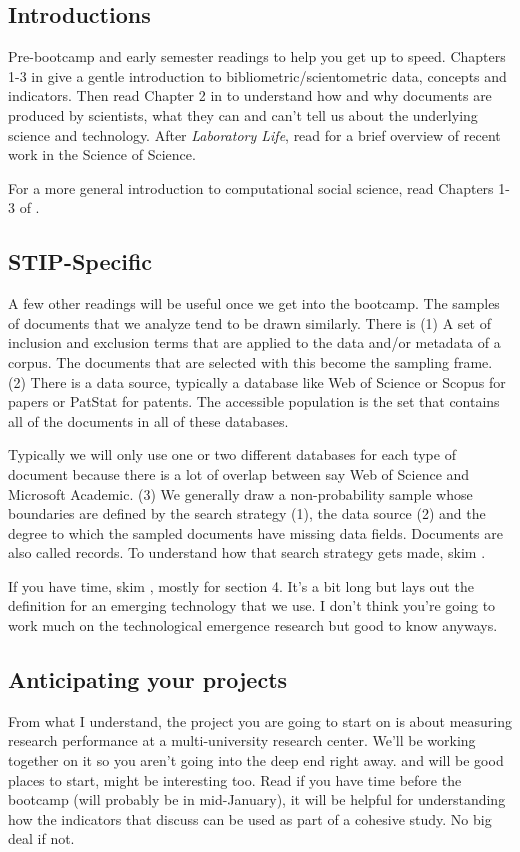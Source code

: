 \documentclass[11pt,letterpaper]{article} %
\begin{document}
\subsection{Introductions}
Pre-bootcamp and early semester readings to help you get up to speed.  Chapters 1-3 in \cite{sugimoto2018measuring} give a gentle introduction to bibliometric/scientometric data, concepts and indicators.  Then read Chapter 2 in \cite{latour_laboratory_1979} to understand how and why documents are produced by scientists, what they can and can't tell us about the underlying science and technology.  After \textit{Laboratory Life}, read \cite{fortunato_science_2018} for a brief overview of recent work in the Science of Science.

For a more general introduction to computational social science, read Chapters 1-3 of \citep{salganik2019bit}.

\subsection{STIP-Specific}
A few other readings will be useful once we get into the bootcamp.  The samples of documents that we analyze tend to be drawn similarly.  There is (1) A set of inclusion and exclusion terms that are applied to the data and/or metadata of a corpus.  The documents that are selected with this become the sampling frame. (2) There is a data source, typically a database like Web of Science or Scopus for papers or PatStat for patents.  The accessible population is the set that contains all of the documents in all of these databases.  

Typically we will only use one or two different databases for each type of document because there is a lot of overlap between say Web of Science and Microsoft Academic.  (3) We generally draw a non-probability sample whose boundaries are defined by the search strategy (1), the data source (2) and the degree to which the sampled documents have missing data fields.  Documents are also called records.  To understand how that search strategy gets made, skim \cite{porter2008refining}.

If you have time, skim \cite{rotolo_what_2015}, mostly for section 4.  It's a bit long but lays out the definition for an emerging technology that we use.  I don't think you're going to work much on the technological emergence research but good to know anyways.  

\subsection{Anticipating your projects}
From what I understand, the project you are going to start on is about measuring research performance at a multi-university research center.  We'll be working together on it so you aren't going into the deep end right away.  \cite{leahey_prominent_2017} and \citep{dahlander_ties_2013} will be good places to start, \cite{biancani_superstars_2018} might be interesting too.  Read \cite{leahey_prominent_2017} if you have time before the bootcamp (will probably be in mid-January), it will be helpful for understanding how the indicators that \cite{sugimoto2018measuring} discuss can be used as part of a cohesive study.  No big deal if not.
\end{document}
